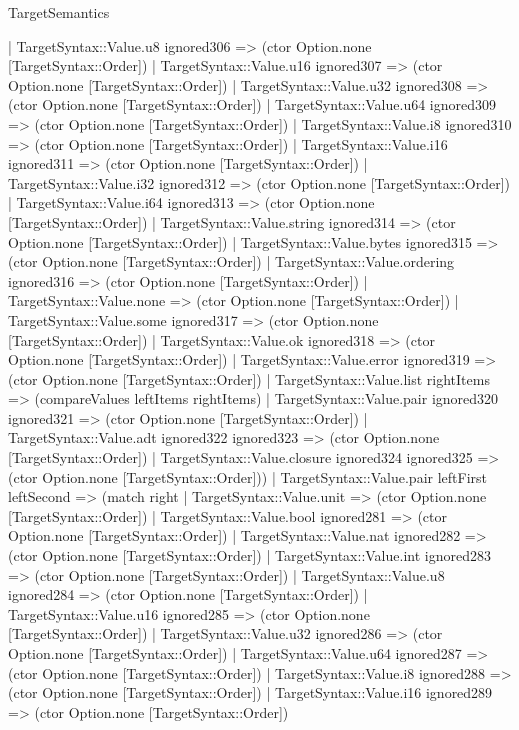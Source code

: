 \begin{lexlean}{TargetSemantics}
\begin{semanticmodule}
{      | TargetSyntax::Value.u8 ignored306 => (ctor Option.none [TargetSyntax::Order])
      | TargetSyntax::Value.u16 ignored307 => (ctor Option.none [TargetSyntax::Order])
      | TargetSyntax::Value.u32 ignored308 => (ctor Option.none [TargetSyntax::Order])
      | TargetSyntax::Value.u64 ignored309 => (ctor Option.none [TargetSyntax::Order])
      | TargetSyntax::Value.i8 ignored310 => (ctor Option.none [TargetSyntax::Order])
      | TargetSyntax::Value.i16 ignored311 => (ctor Option.none [TargetSyntax::Order])
      | TargetSyntax::Value.i32 ignored312 => (ctor Option.none [TargetSyntax::Order])
      | TargetSyntax::Value.i64 ignored313 => (ctor Option.none [TargetSyntax::Order])
      | TargetSyntax::Value.string ignored314 => (ctor Option.none [TargetSyntax::Order])
      | TargetSyntax::Value.bytes ignored315 => (ctor Option.none [TargetSyntax::Order])
      | TargetSyntax::Value.ordering ignored316 => (ctor Option.none [TargetSyntax::Order])
      | TargetSyntax::Value.none => (ctor Option.none [TargetSyntax::Order])
      | TargetSyntax::Value.some ignored317 => (ctor Option.none [TargetSyntax::Order])
      | TargetSyntax::Value.ok ignored318 => (ctor Option.none [TargetSyntax::Order])
      | TargetSyntax::Value.error ignored319 => (ctor Option.none [TargetSyntax::Order])
      | TargetSyntax::Value.list rightItems => (compareValues leftItems rightItems)
      | TargetSyntax::Value.pair ignored320 ignored321 => (ctor Option.none [TargetSyntax::Order])
      | TargetSyntax::Value.adt ignored322 ignored323 => (ctor Option.none [TargetSyntax::Order])
      | TargetSyntax::Value.closure ignored324 ignored325 => (ctor Option.none [TargetSyntax::Order]))
    | TargetSyntax::Value.pair leftFirst leftSecond => (match right
      | TargetSyntax::Value.unit => (ctor Option.none [TargetSyntax::Order])
      | TargetSyntax::Value.bool ignored281 => (ctor Option.none [TargetSyntax::Order])
      | TargetSyntax::Value.nat ignored282 => (ctor Option.none [TargetSyntax::Order])
      | TargetSyntax::Value.int ignored283 => (ctor Option.none [TargetSyntax::Order])
      | TargetSyntax::Value.u8 ignored284 => (ctor Option.none [TargetSyntax::Order])
      | TargetSyntax::Value.u16 ignored285 => (ctor Option.none [TargetSyntax::Order])
      | TargetSyntax::Value.u32 ignored286 => (ctor Option.none [TargetSyntax::Order])
      | TargetSyntax::Value.u64 ignored287 => (ctor Option.none [TargetSyntax::Order])
      | TargetSyntax::Value.i8 ignored288 => (ctor Option.none [TargetSyntax::Order])
      | TargetSyntax::Value.i16 ignored289 => (ctor Option.none [TargetSyntax::Order])
}
\end{semanticmodule}
\end{lexlean}
